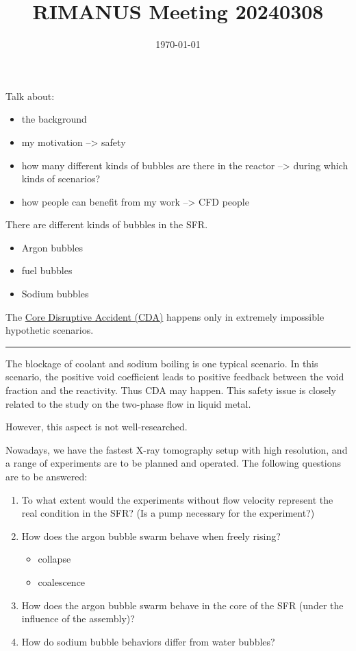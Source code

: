 \documentclass[11pt]{article}
\date{\today}
\title{RIMANUS Meeting 20240308}
\begin{document}
\maketitle
\tableofcontents

Talk about:

\begin{itemize}
\item the background
\item my motivation --> safety
\item how many different kinds of bubbles are there in the reactor --> during which kinds of scenarios?
\item how people can benefit from my work --> CFD people
\end{itemize}

There are different kinds of bubbles in the SFR.

\begin{itemize}
\item Argon bubbles
\item fuel bubbles
\item Sodium bubbles
\end{itemize}

The \href{20240307154931-core_disruptive_accident_cda.org}{Core Disruptive Accident (CDA)} happens only in extremely impossible hypothetic scenarios.

\noindent\rule{\textwidth}{0.5pt}
The blockage of coolant and sodium boiling is one typical scenario. In this scenario, the positive void coefficient leads to positive feedback between the void fraction and the reactivity. Thus CDA may happen. This safety issue is closely related to the study on the two-phase flow in liquid metal.

However, this aspect is not well-researched.

Nowadays, we have the fastest X-ray tomography setup with high resolution, and a range of experiments are to be planned and operated. The following questions are to be answered:

\begin{enumerate}
\item To what extent would the experiments without flow velocity represent the real condition in the SFR? (Is a pump necessary for the experiment?)
\item How does the argon bubble swarm behave when freely rising?
\begin{itemize}
\item collapse
\item coalescence
\end{itemize}
\item How does the argon bubble swarm behave in the core of the SFR (under the influence of the assembly)?
\item How do sodium bubble behaviors differ from water bubbles?
\end{enumerate}
\end{document}
